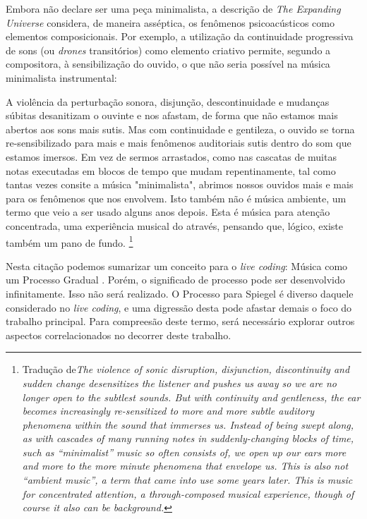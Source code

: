 Embora não declare ser uma peça minimalista, a descrição de \emph{The Expanding Universe} considera, de maneira asséptica, os fenômenos psicoacústicos como elementos composicionais. Por exemplo, a utilização da continuidade progressiva de sons (ou \emph{drones} transitórios) como elemento criativo permite, segundo a compositora, à sensibilização do ouvido, o que não seria possível na música minimalista instrumental:

\begin{citacao}
 A violência da perturbação sonora, disjunção, descontinuidade e mudanças súbitas desanitizam o ouvinte e nos afastam, de forma que não estamos mais abertos aos sons mais sutis. Mas com continuidade e gentileza, o ouvido se torna re-sensibilizado para mais e mais fenômenos auditoriais sutis dentro do som que estamos imersos. Em vez de sermos arrastados, como nas cascatas de muitas notas executadas em blocos de tempo que mudam repentinamente, tal como tantas vezes consite a música "minimalista", abrimos nossos ouvidos mais e mais para os fenômenos que nos envolvem. Isto também não é música ambiente, um termo que veio a ser usado alguns anos depois. Esta é música para atenção concentrada, uma experiência musical do através, pensando que, lógico, existe também um pano de fundo. \footnote{Tradução de\emph{The violence of sonic disruption, disjunction, discontinuity and sudden change desensitizes the listener and pushes us away so we are no longer open to the subtlest sounds. But with continuity and gentleness, the ear becomes increasingly re-sensitized to more and more subtle auditory phenomena within the sound that immerses us. Instead of being swept along, as with cascades of many running notes in suddenly-changing blocks of time, such as “minimalist” music so often consists of, we open up our ears more and more to the more minute phenomena that envelope us. This is also not “ambient music”, a term that came into use some years later. This is music for concentrated attention, a through-composed musical experience, though of course it also can be background.}}
\end{citacao}

Nesta citação podemos sumarizar um conceito para o \emph{live coding}: Música como um Processo Gradual . Porém, o significado de processo pode ser desenvolvido infinitamente. Isso não será realizado. O Processo para Spiegel é diverso daquele considerado no \emph{live coding}, e uma digressão desta pode afastar demais o foco do trabalho principal. Para compreesão deste termo, será necessário explorar outros aspectos correlacionados no decorrer deste trabalho.

